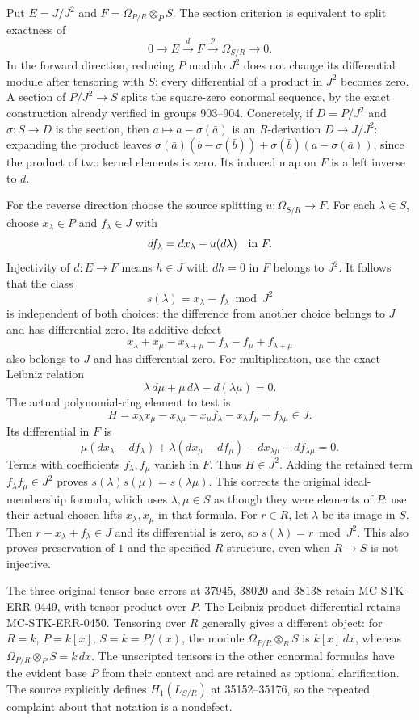Put \(E=J/J^2\) and \(F=\Omega_{P/R}\otimes_PS\). The section criterion is equivalent to split exactness of \[
0\longrightarrow E\xrightarrow{d}F\xrightarrow{p}\Omega_{S/R}\longrightarrow0.
\] In the forward direction, reducing \(P\) modulo \(J^2\) does not change its differential module after tensoring with \(S\): every differential of a product in \(J^2\) becomes zero. A section of \(P/J^2\to S\) splits the square-zero conormal sequence, by the exact construction already verified in groups 903--904. Concretely, if \(D=P/J^2\) and \(\sigma:S\to D\) is the section, then \(a\mapsto a-\sigma(\bar a)\) is an \(R\)-derivation \(D\to J/J^2\): expanding the product leaves \(\sigma(\bar a)(b-\sigma(\bar b))+\sigma(\bar b)(a-\sigma(\bar a))\), since the product of two kernel elements is zero. Its induced map on \(F\) is a left inverse to \(d\).

For the reverse direction choose the source splitting \(u:\Omega_{S/R}\to F\). For each \(\lambda\in S\), choose \(x_\lambda\in P\) and \(f_\lambda\in J\) with \[
df_\lambda=dx_\lambda-u(d\lambda)\quad\hbox{in }F.
\] Injectivity of \(d:E\to F\) means \(h\in J\) with \(dh=0\) in \(F\) belongs to \(J^2\). It follows that the class \[
s(\lambda)=x_\lambda-f_\lambda\bmod J^2
\] is independent of both choices: the difference from another choice belongs to \(J\) and has differential zero. Its additive defect \[
x_\lambda+x_\mu-x_{\lambda+\mu}-f_\lambda-f_\mu+f_{\lambda+\mu}
\] also belongs to \(J\) and has differential zero. For multiplication, use the exact Leibniz relation \[
\lambda\,d\mu+\mu\,d\lambda-d(\lambda\mu)=0.
\] The actual polynomial-ring element to test is \[
H=x_\lambda x_\mu-x_{\lambda\mu}
-x_\mu f_\lambda-x_\lambda f_\mu+f_{\lambda\mu}\in J.
\] Its differential in \(F\) is \[
\mu(dx_\lambda-df_\lambda)+\lambda(dx_\mu-df_\mu)
-dx_{\lambda\mu}+df_{\lambda\mu}=0.
\] Terms with coefficients \(f_\lambda,f_\mu\) vanish in \(F\). Thus \(H\in J^2\). Adding the retained term \(f_\lambda f_\mu\in J^2\) proves \(s(\lambda)s(\mu)=s(\lambda\mu)\). This corrects the original ideal-membership formula, which uses \(\lambda,\mu\in S\) as though they were elements of \(P\): use their actual chosen lifts \(x_\lambda,x_\mu\) in that formula. For \(r\in R\), let \(\lambda\) be its image in \(S\). Then \(r-x_\lambda+f_\lambda\in J\) and its differential is zero, so \(s(\lambda)=r\bmod J^2\). This also proves preservation of \(1\) and the specified \(R\)-structure, even when \(R\to S\) is not injective.

The three original tensor-base errors at 37945, 38020 and 38138 retain MC-STK-ERR-0449, with tensor product over \(P\). The Leibniz product differential retains MC-STK-ERR-0450. Tensoring over \(R\) generally gives a different object: for \(R=k\), \(P=k[x]\), \(S=k=P/(x)\), the module \(\Omega_{P/R}\otimes_RS\) is \(k[x]\,dx\), whereas \(\Omega_{P/R}\otimes_PS=k\,dx\). The unscripted tensors in the other conormal formulas have the evident base \(P\) from their context and are retained as optional clarification. The source explicitly defines \(H_1(L_{S/R})\) at 35152--35176, so the repeated complaint about that notation is a nondefect.

